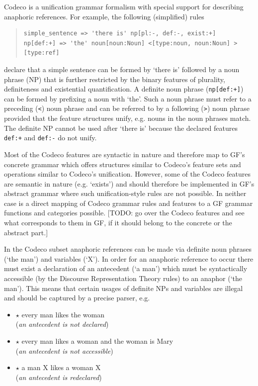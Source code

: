 \documentclass[a4paper]{article}
\begin{document}
Codeco is a unification grammar formalism with special support for describing
anaphoric references. For example, the following (simplified) rules

\small
\begin{quote}
\begin{verbatim}
simple_sentence => 'there is' np[pl:-, def:-, exist:+]
np[def:+] => 'the' noun[noun:Noun] <[type:noun, noun:Noun] >[type:ref]
\end{verbatim}
\end{quote}
\normalsize

declare that a simple
sentence can be formed by `there is' followed by
a noun phrase (NP) that is further restricted by the binary features of
plurality, definiteness and existential quantification.
A definite noun phrase (\verb!np[def:+]!) can be formed by prefixing
a noun with `the'. Such a noun phrase
must refer to a preceding (\verb!<!) noun phrase and can be referred to by a
following (\verb!>!) noun phrase provided that the feature structures
unify, e.g. nouns in the noun phrases match.
The definite NP cannot be used after `there is' because the
declared features \verb!def:+! and \verb!def:-! do not unify.

Most of the Codeco features are syntactic in nature and therefore map to
GF's concrete grammar which offers structures similar to Codeco's feature
sets and operations similar to Codeco's unification. However, some of the
Codeco features are semantic in nature (e.g. `exists') and should therefore be
implemented in GF's abstract grammar where such unification-style rules are
not possible. In neither case is a direct mapping of Codeco grammar rules
and features to a GF grammar functions and categories possible.
[TODO: go over the Codeco features and see what corresponds to them
in GF, if it should belong to the concrete or the abstract part.]

In the Codeco subset anaphoric references can be made via definite noun
phrases (`the man') and variables (`X'). In order for an anaphoric reference
to occur there must exist a declaration of an antecedent (`a man') which must
be syntactically accessible (by the Discourse Representation Theory rules)
to an anaphor (`the man'). This means that certain usages of definite NPs
and variables are illegal and should be captured by a precise parser, e.g.

\begin{itemize}
\item $\star$ every man likes the woman \hfill \\
(\emph{an antecedent is not declared})
\item $\star$ every man likes a woman and the woman is Mary \hfill \\
(\emph{an antecedent is not accessible})
\item $\star$ a man X likes a woman X \hfill \\
(\emph{an antecedent is redeclared})
\end{itemize}
\end{document}
